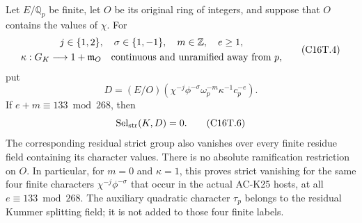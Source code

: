 \begin{theorem}
\label{AC-G144}
Let $E/\mathbb Q_p$ be finite, let $O$ be its original ring of integers,
and suppose that $O$ contains the values of $\chi$.
For
\[
 \begin{gathered}
 j\in\{1,2\},\quad \sigma\in\{1,-1\},\quad m\in\mathbb Z,\quad e\geq1,\\
 \kappa:G_K\longrightarrow1+\mathfrak m_O
       \quad\hbox{continuous and unramified away from }p,
 \end{gathered}
 \tag{C16T.4}
\]
put
\[
       D=(E/O)(\chi^{-j}\phi^{-\sigma}
                        \omega_p^{-m}\kappa^{-1}c_p^{-e}).
 \tag{C16T.5}
\]
If $e+m\equiv133\bmod268$, then
\[
                 \operatorname{Sel}_{\rm str}(K,D)=0 .
 \tag{C16T.6}
\]
The corresponding residual strict group also vanishes over every
finite residue field containing its character values.
There is no absolute ramification restriction on $O$.
In particular, for $m=0$ and $\kappa=1$, this proves strict vanishing
for the same four finite characters $\chi^{-j}\phi^{-\sigma}$ that
occur in the actual AC-K25 hosts, at all $e\equiv133\bmod268$.
The auxiliary quadratic character $\tau_p$ belongs to the residual
Kummer splitting field; it is not added to those four finite labels.
\end{theorem}

